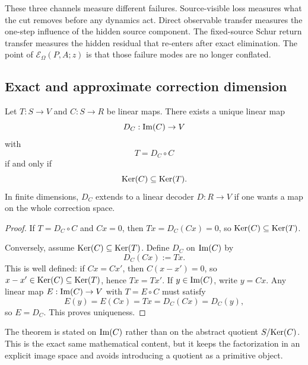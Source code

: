 \begin{remark}
\label{rem:task-visible-defect-separation}
These three channels measure different failures. Source-visible loss measures
what the cut removes before any dynamics act. Direct observable transfer
measures the one-step influence of the hidden source component. The fixed-source
Schur return transfer measures the hidden residual that re-enters after exact
elimination. The point of \(\mathcal E_{\Omega}(P,A;z)\) is that those failure
modes are no longer conflated.
\end{remark}

\subsection{Exact and approximate correction dimension}

\begin{theorem}
\label{thm:exact-correction-factorization}
Let \(T:S\to V\) and \(C:S\to R\) be linear maps. There exists a unique linear
map
\[
D_C:\mathrm{Im}(C)\to V
\]
with
\[
T=D_C\circ C
\]
if and only if
\[
\mathrm{Ker}(C)\subseteq \mathrm{Ker}(T).
\]
In finite dimensions, \(D_C\) extends to a linear decoder \(D:R\to V\) if one
wants a map on the whole correction space.
\end{theorem}

\begin{proof}
If \(T=D_C\circ C\) and \(Cx=0\), then \(Tx=D_C(Cx)=0\), so
\(\mathrm{Ker}(C)\subseteq\mathrm{Ker}(T)\).

Conversely, assume \(\mathrm{Ker}(C)\subseteq\mathrm{Ker}(T)\). Define \(D_C\) on \(\mathrm{Im}(C)\) by
\[
D_C(Cx):=Tx.
\]
This is well defined: if \(Cx=Cx'\), then \(C(x-x')=0\), so
\(x-x'\in\mathrm{Ker}(C)\subseteq\mathrm{Ker}(T)\), hence \(Tx=Tx'\).
If \(y\in\mathrm{Im}(C)\), write \(y=Cx\). Any linear map \(E:\mathrm{Im}(C)\to V\) with
\(T=E\circ C\) must satisfy
\[
E(y)=E(Cx)=Tx=D_C(Cx)=D_C(y),
\]
so \(E=D_C\). This proves uniqueness.
\end{proof}

\begin{remark}
\label{rem:quotient-free-exact-correction}
The theorem is stated on \(\mathrm{Im}(C)\) rather than on the abstract quotient
\(S/\mathrm{Ker}(C)\). This is the exact same mathematical content, but it keeps the
factorization in an explicit image space and avoids introducing a quotient as a
primitive object.
\end{remark}


